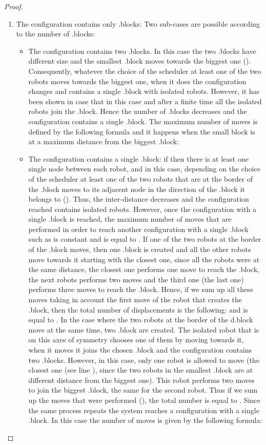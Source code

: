 \documentclass[12pt]{llncs}
\begin{document}
\begin{proof}
\begin{enumerate}
\item{The configuration contains only .blocks:} Two sub-cases are possible according to the number of .blocks:
\begin{itemize}
\item{The configuration contains two .blocks.} In this case the two .blocks have different size and the smallest .block moves towards the biggest one (). Consequently, whatever the choice of the scheduler at least one of the two robots moves towards the biggest one, when it does the configuration changes and contains a single .block with isolated robots. However, it has been shown in case  that in this case and after a finite time all the isolated robots join the .block. Hence the number of .blocks decreases and the configuration contains a single .block. The maximum number of moves is defined by the following formula and it happens when the small block is at a maximum distance from the biggest .block: 
\item{The configuration contains a single .block:} if  then there is at least one single node between each robot, and in this case, depending on the choice of the scheduler at least one of the two robots that are at the border of the .block moves to its adjacent node in the direction of the .block it belongs to (). Thus, the inter-distance decreases and the configuration reached contains isolated robots. However, once the configuration with a single .block is reached, the maximum number of moves that are performed in order to reach another configuration with a single .block  such as  is constant and is equal to . If one of the two robots at the border of the .block moves, then one .block is created and all the other robots move towards it starting with the closest one, since all the robots were at the same distance, the closest one performs one move to reach the .block, the next robots performs two moves and the third one (the last one) performs three moves to reach the .block. Hence, if we sum up all these moves taking in account the first move of the robot that creates the .block, then the total number of displacements is the following:  and is equal to . In the case where the two robots at the border of the d.block move at the same time, two .block are created. The isolated robot that is on this axes of symmetry chooses one of them by moving towards it, when it moves it joins the chosen .block and the configuration contains two .blocks. However, in this case, only one robot is allowed to move (the closest one (see line ), since the two robots in the smallest .block are at different distance from the biggest one). This robot performs two moves to join the biggest .block, the same for the second robot. Thus if we sum up the moves that were performed (), the total number is equal to . Since  the same process repeats the system reaches a configuration with a single .block. 
In this case the number of moves is given by the following formula:
 

\end{itemize}
\end{enumerate}
\end{proof}
\end{document}

